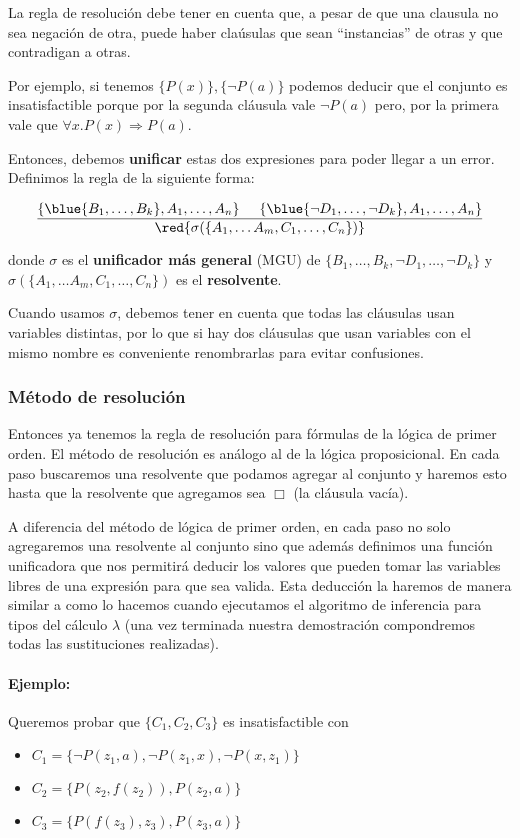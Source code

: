 La regla de resolución debe tener en cuenta que, a pesar de que una clausula no sea negación de otra, puede haber claúsulas que sean ``instancias'' de otras y que contradigan a otras.

Por ejemplo, si tenemos $\{{P(x)\}, \{\lnot P(a)\}}$ podemos deducir que el conjunto es insatisfactible porque por la segunda cláusula vale $\lnot P(a)$ pero, por la primera vale que $\forall x.P(x) \Rightarrow P(a)$.

Entonces, debemos \textbf{unificar} estas dos expresiones para poder llegar a un error. Definimos la regla de la siguiente forma:

$$\frac{\{\blue{B_1,\dots,B_k},A_1,\dots,A_n\}\hspace*{5mm}\{\blue{\lnot D_1,\dots,\lnot D_k},A_1,\dots,A_n\}}{\red{\sigma(\{A_1,\dots A_m, C_1,\dots,C_n\})}}$$

donde $\sigma$ es el \textbf{unificador más general} (MGU) de $\{B_1,\dots,B_k,\lnot D_1,\dots,\lnot D_k\}$ y $\sigma(\{A_1,\dots A_m, C_1,\dots,C_n\})$ es el \textbf{resolvente}.

Cuando usamos $\sigma$, debemos tener en cuenta que todas las cláusulas usan variables distintas, por lo que si hay dos cláusulas que usan variables con el mismo nombre es conveniente renombrarlas para evitar confusiones.

\subsubsection{Método de resolución}

Entonces ya tenemos la regla de resolución para fórmulas de la lógica de primer orden. El método de resolución es análogo al de la lógica proposicional. En cada paso buscaremos una resolvente que podamos agregar al conjunto y haremos esto hasta que la resolvente que agregamos sea $\Box$ (la cláusula vacía).

A diferencia del método de lógica de primer orden, en cada paso no solo agregaremos una resolvente al conjunto sino que además definimos una función unificadora que nos permitirá deducir los valores que pueden tomar las variables libres de una expresión para que sea valida. Esta deducción la haremos de manera similar a como lo hacemos cuando ejecutamos el algoritmo de inferencia para tipos del cálculo $\lambda$ (una vez terminada nuestra demostración compondremos todas las sustituciones realizadas).

\paragraph{Ejemplo:} Queremos probar que $\{C_1, C_2, C_3\}$ es insatisfactible con
\begin{itemize}
\item $C_1 = \{\lnot P(z_1,a), \lnot P(z_1,x), \lnot P(x,z_1)\}$
\item $C_2 = \{P(z_2,f(z_2)), P(z_2,a)\}$
\item $C_3 = \{P(f(z_3),z_3), P(z_3,a)\}$
\end{itemize}

